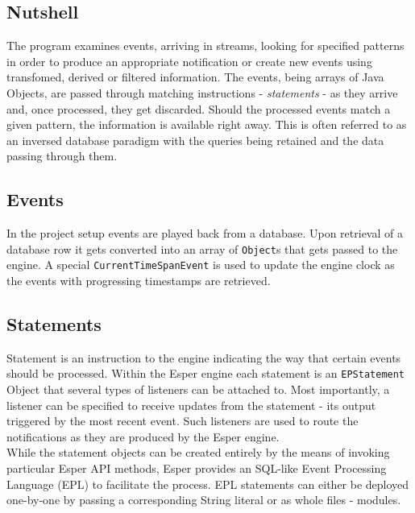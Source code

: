\subsection{Nutshell}
The program examines events, arriving in streams, looking for specified patterns in order to produce an appropriate notification or create new events using transfomed, 
	derived or filtered information.
The events, being arrays of Java Objects, are passed through matching instructions - \emph{statements} - as they arrive and, once processed, they get discarded.
Should the processed events match a given pattern, the information is available right away. 
This is often referred to as an inversed database paradigm with the queries being retained and the data passing through them.

\subsection{Events}
In the project setup events are played back from a database. Upon retrieval of a database row it gets converted into an array of \texttt{Object}s that gets passed to the engine. 
A special \texttt{CurrentTimeSpanEvent} is used to update the engine clock as the events with progressing timestamps are retrieved.

\subsection{Statements}
Statement is an instruction to the engine indicating the way that certain events should be processed. Within the Esper engine each statement is an \texttt{EPStatement} Object that several types of 
listeners can be attached to. Most importantly, a listener can be specified to receive updates from the statement - its output triggered by the most recent event. Such listeners are used to route the
notifications as they are produced by the Esper engine. \\
While the statement objects can be created entirely by the means of invoking particular Esper API methods, Esper provides an SQL-like Event Processing Language (EPL) to facilitate the process.
EPL statements can either be deployed one-by-one by passing a corresponding String literal or as whole files - modules.



